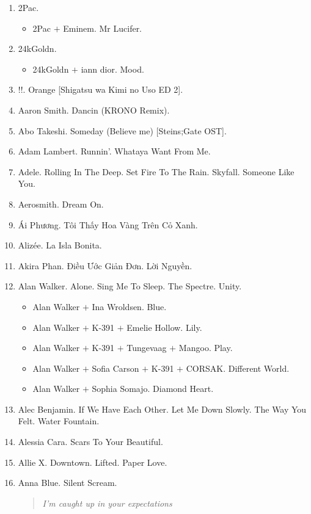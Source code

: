 \documentclass{article}
\begin{document}
\begin{enumerate}
	\item {\sc 2Pac.}
	\begin{itemize}
		\item {\sc 2Pac $+$ Eminem.} Mr Lucifer.
	\end{itemize}
	\item {\sc 24kGoldn.}
	\begin{itemize}
		\item {\sc 24kGoldn $+$ iann dior.} Mood.
	\end{itemize}
	\item {!!.} Orange [Shigatsu wa Kimi no Uso ED 2].
	\item {\sc Aaron Smith.} Dancin (KRONO Remix).
	\item {\sc Abo Takeshi.} Someday (Believe me) [Steins;Gate OST].
	\item {\sc Adam Lambert.} Runnin'. Whataya Want From Me.
	\item {\sc Adele.} Rolling In The Deep. Set Fire To The Rain. Skyfall. Someone Like You.
	\item {\sc Aerosmith.} Dream On.
	\item {\sc Ái Phương.} Tôi Thấy Hoa Vàng Trên Cỏ Xanh.
	\item {\sc Alizée.} La Isla Bonita.
	\item {\sc Akira Phan.} Điều Ước Giản Đơn. Lời Nguyền.
	\item {\sc Alan Walker.} Alone. Sing Me To Sleep. The Spectre. Unity.
	\begin{itemize}
		\item {\sc Alan Walker $+$ Ina Wroldsen.} Blue.
		\item {\sc Alan Walker $+$ K-391 $+$ Emelie Hollow.} Lily.
		\item {\sc Alan Walker $+$ K-391 $+$ Tungevaag $+$ Mangoo.} Play.
		\item {\sc Alan Walker $+$ Sofia Carson $+$ K-391 $+$ CORSAK.} Different World.
		\item {\sc Alan Walker $+$ Sophia Somajo.} Diamond Heart.
	\end{itemize}
	\item {\sc Alec Benjamin.} If We Have Each Other. Let Me Down Slowly. The Way You Felt. Water Fountain.
	\item {\sc Alessia Cara.} Scars To Your Beautiful.
	\item {\sc Allie X.} Downtown. Lifted. Paper Love.
	\item {\sc Anna Blue.} Silent Scream.
	\begin{quotation}\it
		I'm caught up in your expectations


\end{quotation}
\end{enumerate}
\end{document}
